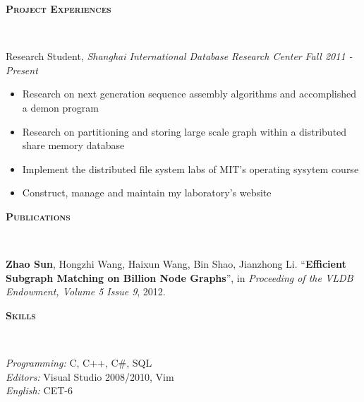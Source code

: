 \documentclass[9pt]{article}
\newenvironment{changemargin}[2]{%
  \begin{list}{}{%
    \setlength{\topsep}{0pt}%
    \setlength{\leftmargin}{#1}%
    \setlength{\rightmargin}{#2}%
    \setlength{\listparindent}{\parindent}%
    \setlength{\itemindent}{\parindent}%
    \setlength{\parsep}{\parskip}%
  }%
  \item[]}{\end{list}
}
\newcommand{\lineover}{
	\begin{changemargin}{-0.05in}{-0.05in}
		\vspace*{-8pt}
		\hrulefill \\
		\vspace*{-2pt}
	\end{changemargin}
}
\newcommand{\header}[1]{
	\begin{changemargin}{-0.5in}{-0.5in}
		\scshape{#1}\\
  	\lineover
	\end{changemargin}
}
\newenvironment{body} {
	\vspace*{-16pt}
	\begin{changemargin}{-0.25in}{-0.5in}
  }	
	{\end{changemargin}
}
\begin{document}
\smallskip


\header{\textbf{Project Experiences}}

\begin{body}
    \vspace{14pt}
    Research Student, \emph{Shanghai International Database Research Center} \hfill \emph{Fall 2011 - Present}
    \vspace*{-4pt}
    \begin{itemize} \itemsep -0pt
        \item Research on next generation sequence assembly algorithms and accomplished a demon program
        \item Research on partitioning and storing large scale graph within a distributed share memory database
        \item Implement the distributed file system labs of MIT's operating sysytem course
        \item Construct, manage and maintain my laboratory's website
    \end{itemize}
\end{body}
\smallskip
\header{\textbf{Publications}}

\begin{body}
	\vspace{14pt}
	\textbf{Zhao Sun}, Hongzhi Wang, Haixun Wang, Bin Shao, Jianzhong Li. ``\textbf{Efficient Subgraph Matching on Billion Node Graphs}'', in \emph{Proceeding of the VLDB Endowment, Volume 5 Issue 9}, 2012.\\
\end{body}
\smallskip


\header{\textbf{Skills}}

\begin{body}
	\vspace{14pt}
	\emph{Programming:}{} C, C++, C\#, SQL\\
    \medskip
    \emph{Editors:}{} Visual Studio 2008/2010, Vim\\
    \medskip
    \emph{English:}{} CET-6
\end{body}
\smallskip


%
%
\end{document}
